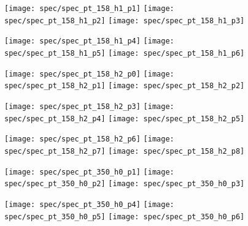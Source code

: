 \begin{figure}[!ht]
  \centering

  \texttt{[image: spec/spec\_pt\_158\_h1\_p1]}
  \texttt{[image: spec/spec\_pt\_158\_h1\_p2]}
  \texttt{[image: spec/spec\_pt\_158\_h1\_p3]}

  \texttt{[image: spec/spec\_pt\_158\_h1\_p4]}
  \texttt{[image: spec/spec\_pt\_158\_h1\_p5]}
  \texttt{[image: spec/spec\_pt\_158\_h1\_p6]}

  \caption{}
  \label{fig:hadron:spec:vzero:all158:h1}
\end{figure}


\begin{figure}[!ht]
  \centering

  \texttt{[image: spec/spec\_pt\_158\_h2\_p0]}
  \texttt{[image: spec/spec\_pt\_158\_h2\_p1]}
  \texttt{[image: spec/spec\_pt\_158\_h2\_p2]}
  
  \texttt{[image: spec/spec\_pt\_158\_h2\_p3]}
  \texttt{[image: spec/spec\_pt\_158\_h2\_p4]}
  \texttt{[image: spec/spec\_pt\_158\_h2\_p5]}

  \texttt{[image: spec/spec\_pt\_158\_h2\_p6]}
  \texttt{[image: spec/spec\_pt\_158\_h2\_p7]}
  \texttt{[image: spec/spec\_pt\_158\_h2\_p8]}

  \caption{}
  \label{fig:hadron:spec:vzero:all158:h2}
\end{figure}


\begin{figure}[!ht]
  \centering

  \texttt{[image: spec/spec\_pt\_350\_h0\_p1]}
  \texttt{[image: spec/spec\_pt\_350\_h0\_p2]}
  \texttt{[image: spec/spec\_pt\_350\_h0\_p3]}

  \texttt{[image: spec/spec\_pt\_350\_h0\_p4]}
  \texttt{[image: spec/spec\_pt\_350\_h0\_p5]}
  \texttt{[image: spec/spec\_pt\_350\_h0\_p6]}

  \caption{}
  \label{fig:hadron:spec:vzero:all350:h0}
\end{figure}


